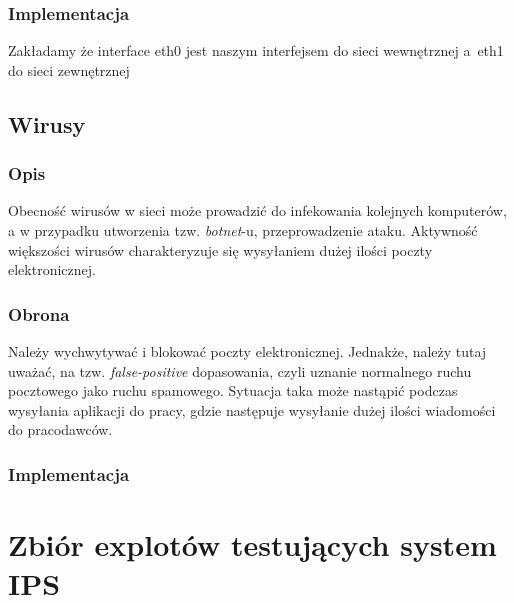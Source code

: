 \documentclass[a4paper,12pt]{book}
\begin{document}
		\subsection{Implementacja}
			\footnotesize
			Zakładamy że interface eth0 jest naszym interfejsem do sieci wewnętrznej a~eth1 do sieci zewnętrznej
			\normalsize
	\section{Wirusy}
		\subsection{Opis}
			Obecność wirusów w sieci może prowadzić do infekowania kolejnych komputerów, a w przypadku utworzenia tzw. \textit{botnet}-u, przeprowadzenie ataku.
			Aktywność większości wirusów charakteryzuje się wysyłaniem dużej ilości poczty elektronicznej.
		\subsection{Obrona}
			Należy wychwytywać i blokować poczty elektronicznej.
			Jednakże, należy tutaj uważać, na tzw. \textit{false-positive} dopasowania, czyli uznanie normalnego ruchu pocztowego jako ruchu spamowego.
			Sytuacja taka może nastąpić podczas wysyłania aplikacji do pracy, gdzie następuje wysyłanie dużej ilości wiadomości do pracodawców.
		\subsection{Implementacja}
			\footnotesize
			\normalsize
\appendix
\chapter{Zbiór explotów testujących system IPS}
\end{document}

